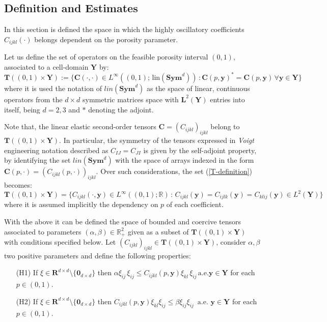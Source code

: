 \subsection{Definition and Estimates}
In this section is defined the space in which the highly oscillatory coefficients $C_{ijkl}(\cdot)$ belongs dependent on the porosity parameter.
\begin{defn}
Let us define the set of operators on the feasible porosity interval $(0,1)$, associated to a cell-domain $\mathbf{Y}$ by:
\begin{equation}
    \label{T-definition}
    \mathbf{T}((0,1) \times \mathbf{Y}) := \big \{ \mathbf{C}(\cdot, \cdot) \in L^{\infty}((0,1); \, \text{lin}(\textbf{Sym}^d))\, : \mathbf{C}(p, \mathbf{y})^* = \mathbf{C}(p, \mathbf{y}) \, \forall \mathbf{y} \in \mathbf{Y}\big \}
\end{equation}
where it is used the notation of $lin(\mathbf{Sym}^d)$ as the space of linear, continuous operators from the $d\times d$ symmetric matrices space with $\mathbf{L}^2(\mathbf{Y})$ entries into itself, being $d=2,3$ and $*$ denoting the adjoint. 
\end{defn}
\begin{rem}
Note that, the linear elastic second-order tensors $\mathbf{C} = (C_{ijkl})_{ijkl}$ belong to $\mathbf{T}((0,1)\times \mathbf{Y})$. In particular, the symmetry of the tensors expressed in \textit{Voigt} engineering notation described as $C_{IJ}=C_{JI}$ is given by the self-adjoint property, by identifying the set $lin(\mathbf{Sym}^d)$ with the space of arrays indexed in the form $\mathbf{C}(p, \cdot) = (C_{ijkl} (p, \cdot) )_{ijkl}$.
Over such considerations, the set (\ref{T-definition}) becomes:
\begin{equation*}
    \mathbf{T}((0,1)\times \mathbf{Y}) = \big \{ C_{ijkl}(\cdot, \mathbf{y}) \in L^{\infty}((0,1); \mathbb{R})  \,:\, C_{ijkl}(\mathbf{y}) = C_{ijlk}(\mathbf{y}) = C_{klij}(\mathbf{y}) \in L^2(\mathbf{Y})\big \}
\end{equation*}
where it is assumed implicitly the dependency on $p$ of each coefficient.
\end{rem}
With the above it can be defined the space of bounded and coercive tensors associated to parameters $(\alpha,\beta) \in \mathbb{R}^2_+$ given as a subset of $\mathbf{T}((0,1)\times \mathbf{Y})$ with conditions specified below.
Let $(C_{ijkl})_{ijkl} \in \mathbf{T}((0,1)\times \mathbf{Y})$, consider $\alpha, \beta$ two positive parameters and define the following properties:
\begin{enumerate}
    \item[(H1)] If $\xi \in \mathbf{R}^{d\times d} \setminus \{\mathbf{0}_{d \times d}\}$ then $\alpha \xi_{ij} \, \xi_{ij} \leq C_{ijkl}(p,\mathbf{y})  \xi_{kl}\,\xi_{ij}\, \text{a.e.} \mathbf{y} \in \mathbf{Y}$ for each $p \in (0,1)$.
    \item[(H2)] If $\xi \in \mathbf{R}^{d\times d} \setminus \{\mathbf{0}_{d \times d}\}$ then $C_{ijkl}(p,\mathbf{y}) \xi_{kl} \xi_{ij} \leq \beta  \xi_{ij} \xi_{ij} \, \text{ a.e. }\mathbf{y} \in \mathbf{Y}$ for each $p \in (0,1)$.
\end{enumerate}
